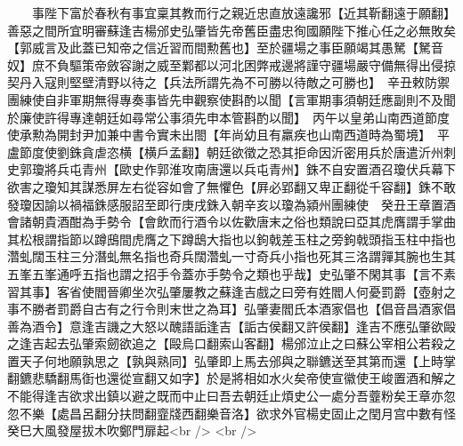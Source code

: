 　　事陛下富於春秋有事宜稟其教而行之親近忠直放遠讒邪【近其靳翻遠于願翻】善惡之間所宜明審蘇逢吉楊邠史弘肇皆先帝舊臣盡忠徇國願陛下推心任之必無敗矣【郭威言及此蓋已知帝之信近習而間勲舊也】至於疆場之事臣願竭其愚駑【駑音奴】庶不負驅策帝斂容謝之威至鄴都以河北困弊戒邊將謹守疆場嚴守備無得出侵掠契丹入寇則堅壁清野以待之【兵法所謂先為不可勝以待敵之可勝也】　辛丑敕防禦團練使自非軍期無得專奏事皆先申觀察使斟酌以聞【言軍期事須朝廷應副則不及聞於廉使許得專達朝廷如尋常公事須先申本管斟酌以聞】　丙午以皇弟山南西道節度使承勲為開封尹加兼中書令實未出閤【年尚幼且有羸疾也山南西道時為蜀境】　平盧節度使劉銖貪虐恣横【横戶孟翻】朝廷欲徵之恐其拒命因沂密用兵於唐遣沂州刺史郭瓊將兵屯青州【歐史作郭淮攻南唐還以兵屯青州】銖不自安置酒召瓊伏兵幕下欲害之瓊知其謀悉屏左右從容如會了無懼色【屛必郢翻又卑正翻從千容翻】銖不敢發瓊因諭以禍福銖感服詔至即行庚戌銖入朝辛亥以瓊為潁州團練使　癸丑王章置酒會諸朝貴酒酣為手勢令【會飲而行酒令以佐歡唐末之俗也類說曰亞其虎膺謂手掌曲其松根謂指節以蹲䲭間虎膺之下蹲鴟大指也以鉤戟差玉柱之旁鉤戟頭指玉柱中指也濳虬闊玉柱三分潛虬無名指也奇兵闊濳虬一寸奇兵小指也死其三洛謂嚲其腕也生其五峯五峯通呼五指也謂之招手令蓋亦手勢令之類也乎哉】史弘肇不閑其事【言不素習其事】客省使閻晉卿坐次弘肇屢教之蘇逢吉戲之曰旁有姓閻人何憂罰爵【壺射之事不勝者罰爵自古有之行令則末世之為耳】弘肇妻閻氏本酒家倡也【倡音昌酒家倡善為酒令】意逢吉譏之大怒以醜語詬逢吉【詬古侯翻又許侯翻】逢吉不應弘肇欲毆之逢吉起去弘肇索劒欲追之【毆烏口翻索山客翻】楊邠泣止之曰蘇公宰相公若殺之置天子何地願孰思之【孰與熟同】弘肇即上馬去邠與之聯鑣送至其第而還【上時掌翻鑣悲驕翻馬衘也還從宣翻又如字】於是將相如水火矣帝使宣徽使王峻置酒和解之不能得逢吉欲求出鎮以避之既而中止曰吾去朝廷止煩史公一處分吾虀粉矣王章亦忽忽不樂【處昌呂翻分扶問翻韲牋西翻樂音洛】欲求外官楊史固止之閏月宫中數有怪癸巳大風發屋拔木吹鄭門扉起<br />
<br />
